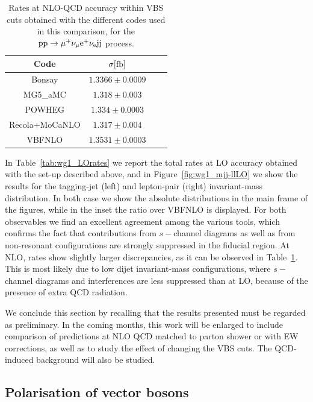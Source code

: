 \begin{table}[h!]
    \centering
    \begin{tabular}{c|c|c|c}
        Code  &  $\sigma[\rm{fb}]$  \\
        \hline
        \hline
        {\sc Bonsay}  &  $1.3366 \pm 0.0009$  \\
        {\sc MG5\_aMC}&  $1.318  \pm 0.003$  \\
        {\sc POWHEG}  &  $1.334 \pm 0.0003$  \\
        {\sc Recola+MoCaNLO}  &  $1.317 \pm 0.004 $ \\
        {\sc VBFNLO}  &  $1.3531 \pm 0.0003$  \\
    \end{tabular}
    \caption{\label{tab:wg1_NLOrates} Rates at NLO-QCD accuracy within VBS cuts obtained with the different codes used in this comparison, 
    for the ${\rm p}{\rm p}\to\mu^+\nu_\mu{\rm e}^+\nu_{\rm e}{\rm j}{\rm j}$ process.}
\end{table}
In Table~\ref{tab:wg1_LOrates} we report the total rates at LO accuracy obtained with the set-up described above, and in Figure~\ref{fig:wg1_mjj-llLO} we show the results
for the tagging-jet (left) and lepton-pair (right) invariant-mass distribution. In both case we show the absolute distributions in the main frame of the 
figures, while in the inset the ratio over {\sc VBFNLO} is displayed. For both observables we find 
an excellent agreement among the various tools, which confirms the fact
that contributions from $s-$channel diagrams as well as from non-resonant configurations are strongly suppressed in the fiducial region.
At NLO, rates show slightly larger discrepancies, as it can be observed in Table~\ref{tab:wg1_NLOrates}. This is most likely due to low dijet invariant-mass configurations, where
$s-$channel diagrams and interferences are less suppressed than at LO, because of the presence of extra QCD radiation.

We conclude this section by recalling that the results presented must be regarded as preliminary.
In the coming months, this work will be enlarged to include comparison of predictions at NLO QCD matched to parton shower or with EW corrections, 
as well as to study the effect of changing 
the VBS cuts. The QCD-induced background will also be studied.

\subsection{Polarisation of vector bosons}

